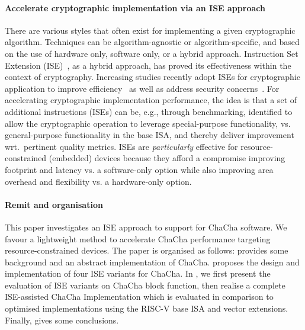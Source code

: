 \paragraph{Accelerate cryptographic implementation via an ISE approach}
There are various styles that often exist for implementing a given cryptographic algorithm. 
Techniques can be algorithm-agnostic or algorithm-specific, and based on the use of hardware only, software only, or a hybrid approach. 
Instruction Set Extension (ISE)~\cite{GalBer:11,BarGioMar:09,RegIen:16}, as a hybrid approach, has proved its effectiveness within the context of cryptography. 
Increasing studies recently adopt ISEs for cryptographic application to improve efficiency~\cite{RCB:20,MNPSW:21} as well as address security concerns~\cite{GMPP:20}. 
For accelerating cryptographic implementation performance,
the idea is that a set of additional instructions (ISEs) can be, e.g., through benchmarking, identified 
to allow the cryptographic operation to leverage special-purpose functionality, 
vs. general-purpose functionality in the base ISA, and thereby deliver improvement wrt.\ pertinent quality metrics.
ISEs are {\em particularly} effective for resource-constrained (embedded) devices 
because they afford a compromise improving footprint and latency vs. a software-only option 
while also improving area overhead and flexibility vs. a hardware-only option.

\paragraph{Remit and organisation}
This paper investigates an ISE approach to support for ChaCha software. We favour a lightweight method to accelerate ChaCha performance targeting resource-constrained devices. The paper is organised as follows:
 provides some background and an abstract implementation of ChaCha.
 proposes the design and implementation of four ISE variants for ChaCha. 
In , we first present the evaluation of ISE variants on ChaCha block function, then realise a complete ISE-assisted ChaCha Implementation which is evaluated in comparison to optimised implementations using the RISC-V base ISA and vector extensions. 
Finally,  gives some conclusions.
